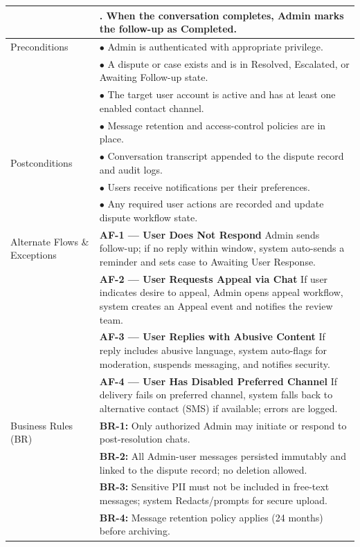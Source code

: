 \begin{longtable}{|>{\raggedright\arraybackslash}p{4cm}|>{\raggedright\arraybackslash}p{11cm}|}
& 8. When the conversation completes, Admin marks the follow-up as Completed. \\
\hline
Preconditions & $\bullet$ Admin is authenticated with appropriate privilege. \\
& $\bullet$ A dispute or case exists and is in Resolved, Escalated, or Awaiting Follow-up state. \\
& $\bullet$ The target user account is active and has at least one enabled contact channel. \\
& $\bullet$ Message retention and access-control policies are in place. \\
\hline
Postconditions & $\bullet$ Conversation transcript appended to the dispute record and audit logs. \\
& $\bullet$ Users receive notifications per their preferences. \\
& $\bullet$ Any required user actions are recorded and update dispute workflow state. \\
\hline
Alternate Flows \& Exceptions & \textbf{AF-1 — User Does Not Respond} \newline Admin sends follow-up; if no reply within window, system auto-sends a reminder and sets case to Awaiting User Response. \\
& \textbf{AF-2 — User Requests Appeal via Chat} \newline If user indicates desire to appeal, Admin opens appeal workflow, system creates an Appeal event and notifies the review team. \\
& \textbf{AF-3 — User Replies with Abusive Content} \newline If reply includes abusive language, system auto-flags for moderation, suspends messaging, and notifies security. \\
& \textbf{AF-4 — User Has Disabled Preferred Channel} \newline If delivery fails on preferred channel, system falls back to alternative contact (SMS) if available; errors are logged. \\
\hline
Business Rules (BR) & \textbf{BR-1:} Only authorized Admin may initiate or respond to post-resolution chats. \\
& \textbf{BR-2:} All Admin-user messages persisted immutably and linked to the dispute record; no deletion allowed. \\
& \textbf{BR-3:} Sensitive PII must not be included in free-text messages; system Redacts/prompts for secure upload. \\
& \textbf{BR-4:} Message retention policy applies (24 months) before archiving. \\

\end{longtable}
